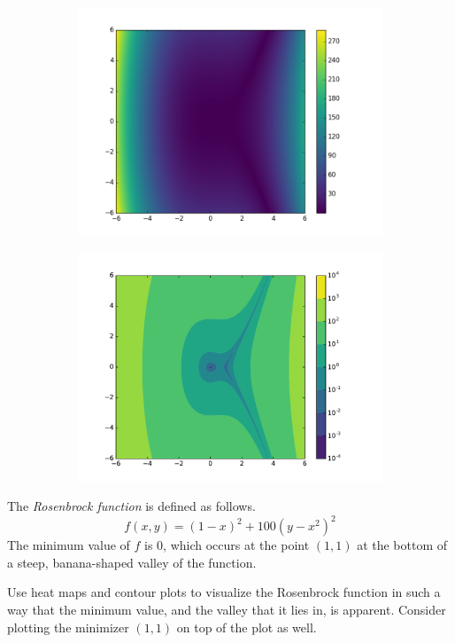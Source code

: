 \begin{figure}[H] %
\centering
\begin{subfigure}{.495\textwidth}
    \centering
    \includegraphics[width=\linewidth]{figures/heatmap_3.png}
\end{subfigure}
%
\begin{subfigure}{.495\textwidth}
    \centering
    \includegraphics[width=\linewidth]{figures/contour_3.pdf}
\end{subfigure}
\end{figure}

\begin{problem} %
The \emph{Rosenbrock function} is defined as follows.
\[f(x,y) = (1-x)^2 + 100(y-x^2)^2\]
The minimum value of $f$ is $0$, which occurs at the point $(1,1)$ at the bottom of a steep, banana-shaped valley of the function.

Use heat maps and contour plots to visualize the Rosenbrock function in such a way that the minimum value, and the valley that it lies in, is apparent.
Consider plotting the minimizer $(1,1)$ on top of the plot as well.
\end{problem}

